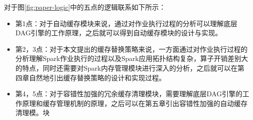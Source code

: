 对于图\ref{fig:paper-logic}中的五点的逻辑联系如下所示：

\begin{itemize}
    \item 第1点：对于自动缓存模块来说，通过对作业执行过程的分析可以理解底层DAG引擎的工作原理，之后就可以得到自动缓存模块的设计与实现。
    \item 第2，3点：对于本文提出的缓存替换策略来说，一方面通过对作业执行过程的分析理解Spark作业执行的过程以及Spark应用拓扑结构复杂，算子开销差别大的特点，同时还需要对Spark内存管理模块进行深入的分析，之后就可以在第四章自然地引出缓存替换策略的设计和实现过程。
    \item 第4，5点：对于容错性加强的冗余缓存清理模块，需要理解底层DAG引擎的工作原理和缓存管理机制的原理，之后可以在第五章引出容错性加强的自动缓存清理模。块
\end{itemize}